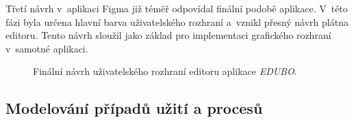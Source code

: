 \documentclass[male,czech,api_bc]{kitheses}
\begin{document}
Třetí návrh v~aplikaci Figma již téměř odpovídal finální podobě aplikace. V~této fázi byla určena hlavní barva uživatelského rozhraní a~vznikl přesný návrh plátna editoru. Tento návrh sloužil jako základ pro implementaci grafického rozhraní v~samotné aplikaci.

\begin{figure}[H]
	\centering
	\caption{Finální návrh uživatelského rozhraní editoru aplikace \textit{EDUBO}.}
	\label{fig:edubo-navrh-3}
\end{figure}

\subsection{Modelování případů užití a procesů}
\end{document}
